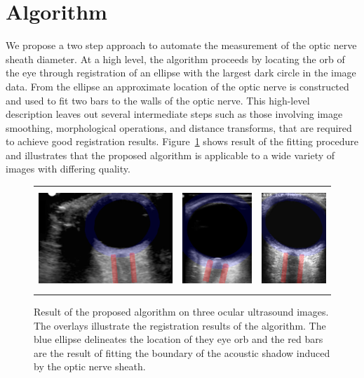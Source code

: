 \documentclass{llncs}
\begin{document}
\section{Algorithm}
We propose a two step approach to automate the measurement of the optic nerve
sheath diameter. At a high level, the algorithm proceeds by locating the orb of
the eye through registration of an ellipse with the largest dark circle in the
image data. From the ellipse an approximate location of the optic nerve is
constructed and used to fit two bars to the walls of the optic nerve. This
high-level description leaves out several intermediate steps such as those
involving image smoothing, morphological operations, and distance transforms,
that are required to achieve good registration results. Figure~\ref{fig:fitted}
shows result of the fitting procedure and illustrates that the proposed
algorithm is applicable to a wide variety of images with differing quality.
\begin{figure}
\centering
\begin{tabular}{ccc}
\includegraphics[height=1.5in]{003-overlay.png} &
\includegraphics[height=1.5in]{009-overlay.png} &
\includegraphics[height=1.5in]{023-overlay.png} 
\end{tabular}
\caption{
\label{fig:fitted}
Result of the proposed algorithm on three ocular ultrasound images. The
overlays illustrate the registration results of the algorithm. The blue ellipse
delineates the location of they eye orb and the red bars are the result of
fitting the boundary of the acoustic shadow induced by the optic nerve sheath.
}
\end{figure}
\end{document}
